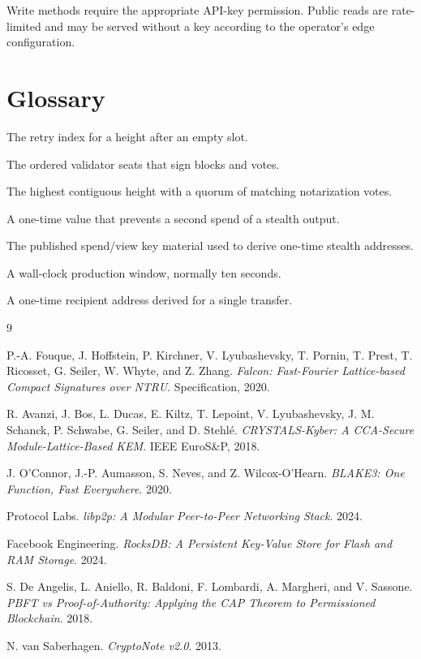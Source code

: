 \documentclass[11pt,a4paper]{article}
\begin{document}
Write methods require the appropriate API-key permission. Public reads are
rate-limited and may be served without a key according to the operator's edge
configuration.

\section{Glossary}

\begin{description}[leftmargin=*]
  \item[Attempt] The retry index for a height after an empty slot.
  \item[Committee] The ordered validator seats that sign blocks and votes.
  \item[Finalized] The highest contiguous height with a quorum of matching
        notarization votes.
  \item[Key image] A one-time value that prevents a second spend of a stealth
        output.
  \item[Meta-address] The published spend/view key material used to derive
        one-time stealth addresses.
  \item[Slot] A wall-clock production window, normally ten seconds.
  \item[Stealth address] A one-time recipient address derived for a single
        transfer.
\end{description}

\begin{thebibliography}{9}

P.-A. Fouque, J. Hoffstein, P. Kirchner, V. Lyubashevsky, T. Pornin,
T. Prest, T. Ricosset, G. Seiler, W. Whyte, and Z. Zhang.
\emph{Falcon: Fast-Fourier Lattice-based Compact Signatures over NTRU}.
Specification, 2020.

R. Avanzi, J. Bos, L. Ducas, E. Kiltz, T. Lepoint, V. Lyubashevsky,
J. M. Schanck, P. Schwabe, G. Seiler, and D. Stehl\'e.
\emph{CRYSTALS-Kyber: A CCA-Secure Module-Lattice-Based KEM}.
IEEE EuroS\&P, 2018.

J. O'Connor, J.-P. Aumasson, S. Neves, and Z. Wilcox-O'Hearn.
\emph{BLAKE3: One Function, Fast Everywhere}.
2020.

Protocol Labs.
\emph{libp2p: A Modular Peer-to-Peer Networking Stack}.
2024.

Facebook Engineering.
\emph{RocksDB: A Persistent Key-Value Store for Flash and RAM Storage}.
2024.

S. De Angelis, L. Aniello, R. Baldoni, F. Lombardi, A. Margheri, and
V. Sassone.
\emph{PBFT vs Proof-of-Authority: Applying the CAP Theorem to Permissioned
Blockchain}.
2018.

N. van Saberhagen.
\emph{CryptoNote v2.0}.
2013.

\end{thebibliography}
\end{document}
